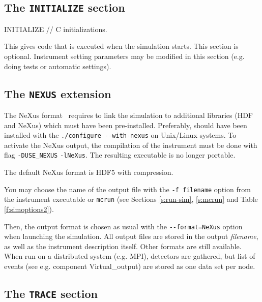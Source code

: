 \subsection{The \texttt{INITIALIZE} section}
\label{s:initialize}

\begin{mcstas}
INITIALIZE
// C initializations. 
\end{mcstas} 
This gives code that is executed when the
simulation starts. This section is optional. Instrument setting parameters may
be modified in this section (e.g. doing tests or automatic settings).

\subsection{The \texttt{NEXUS} extension}
\label{s:nexus}

The NeXus format~\cite{nexus_webpage} requires to link the simulation to
additional libraries (HDF and NeXus) which must have been
pre-installed. Preferably, \MCS should have been installed with the
\verb+./configure --with-nexus+ on Unix/Linux systems. To activate the NeXus
output, the compilation of the instrument must be done with flag
\verb+-DUSE_NEXUS+ \verb+-lNeXus+.
The resulting executable is no longer portable.

The default NeXus format is HDF5 with compression. 

You may choose the name of the output file with the \verb+-f filename+ option
from the instrument executable or \verb+mcrun+ (see Sections \ref{s:run-sim},
\ref{s:mcrun} and Table \ref{f:simoptions2}).

Then, the output format is chosen as usual with the \verb+--format=NeXus+ option
when launching the simulation. All output files are stored in the output
 \textit{filename},
as well as the instrument description itself. Other formats are
still available. When run on a distributed system (e.g. MPI), detectors are
gathered, but list of events (see e.g. component Virtual\_output) are stored as
one data set per node.

\subsection{The \texttt{TRACE} section}
\label{s:trace}


